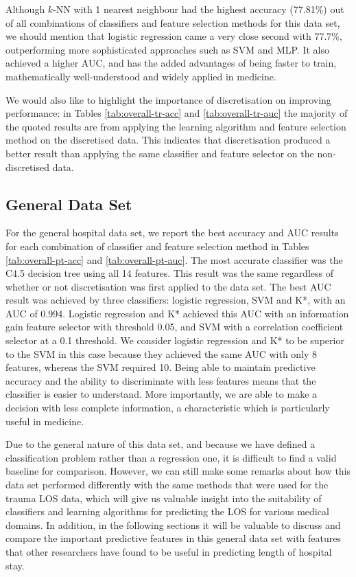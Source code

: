 Although $k$-NN with 1 nearest neighbour had the highest accuracy (77.81\%) out
of all combinations of classifiers and feature selection methods for this data
set, we should mention that logistic regression came a very close second with
77.7\%, outperforming more sophisticated approaches such as SVM and MLP. It
also achieved a higher AUC, and has the added advantages of being faster to
train, mathematically well-understood and widely applied in medicine.

We would also like to highlight the importance of discretisation on improving
performance: in Tables \ref{tab:overall-tr-acc} and
\ref{tab:overall-tr-auc} the majority of the quoted results are from applying
the learning algorithm and feature selection method on the discretised data.
This indicates that discretisation produced a better result than applying the
same classifier and feature selector on the non-discretised data.

\subsection{General Data Set}
For the general hospital data set, we report the best accuracy and AUC results
for each combination of classifier and feature selection method in Tables
\ref{tab:overall-pt-acc} and \ref{tab:overall-pt-auc}. The most accurate
classifier was the C4.5 decision tree using all 14 features.
This result was the same
regardless of whether or not discretisation was first applied to the data set.
The best AUC result was achieved by three classifiers: logistic regression, SVM
and K*, with an AUC of 0.994. Logistic regression and K* achieved this AUC with
an information gain feature selector with threshold 0.05, and SVM with a
correlation coefficient selector at a 0.1 threshold. We consider logistic
regression and K* to be superior to the SVM in this case because they achieved
the same AUC with only 8 features, whereas the SVM required 10. Being able to
maintain predictive accuracy and the ability to discriminate with less features
means that the classifier is easier to understand. More importantly, we are
able to make a decision with less complete information, a characteristic
which is particularly useful in medicine.




Due to the general nature of this data set, and because we have defined a
classification problem rather than a regression one, it is difficult to find a
valid baseline for comparison. However, we can still make some remarks about
how this data set performed differently with the same methods that were used
for the trauma LOS data, which will give us valuable insight into the
suitability of classifiers and learning algorithms for predicting the LOS for
various medical domains. In addition, in the following sections it will be
valuable to discuss and compare the important predictive features in this
general data set with features that other researchers have found to be
useful in predicting length of hospital stay.

